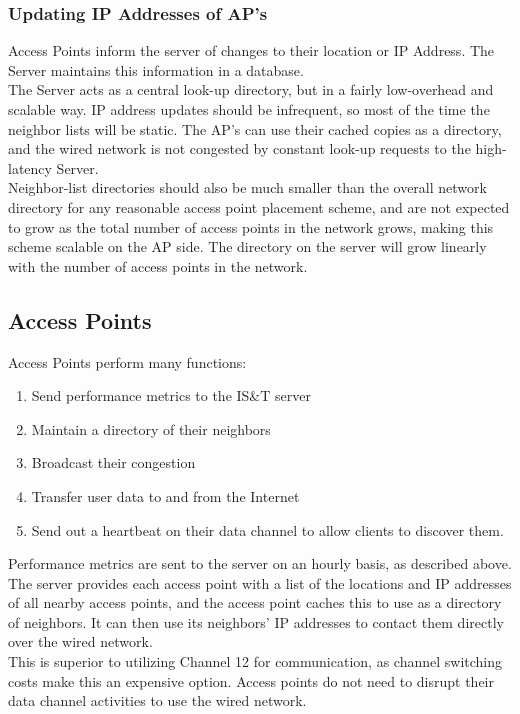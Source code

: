 \documentclass[11pt,twocolumn]{article}
\begin{document}
\subsubsection{Updating IP Addresses of AP's}
\indent Access Points inform the server of changes to their location or IP Address. The Server maintains this information in a database.\\
\indent The Server acts as a central look-up directory, but in a fairly low-overhead and scalable way. IP address updates should be infrequent, so most of the time the neighbor lists will be static. The AP's can use their cached copies as a directory, and the wired network is not congested by constant look-up requests to the high-latency Server.\\
\indent Neighbor-list directories should also be much smaller than the overall network directory for any reasonable access point placement scheme, and are not expected to grow as the total number of access points in the network grows, making this scheme scalable on the AP side. The directory on the server will grow linearly with the number of access points in the network.

\subsection{Access Points}
\indent Access Points perform many functions:
\begin{enumerate}
	\item Send performance metrics to the IS\&T server
	\item Maintain a directory of their neighbors
	\item Broadcast their congestion
	\item Transfer user data to and from the Internet
	\item Send out a heartbeat on their data channel to allow clients to discover them. 
\end{enumerate}
\indent Performance metrics are sent to the server on an hourly basis, as described above. The server provides each access point with a list of the locations and IP addresses of all nearby access points, and the access point caches this to use as a directory of neighbors. It can then use its neighbors’ IP addresses to contact them directly over the wired network.\\
\indent This is superior to utilizing Channel 12 for communication, as channel switching costs make this an expensive option. Access points do not need to disrupt their data channel activities to use the wired network.
\end{document}
